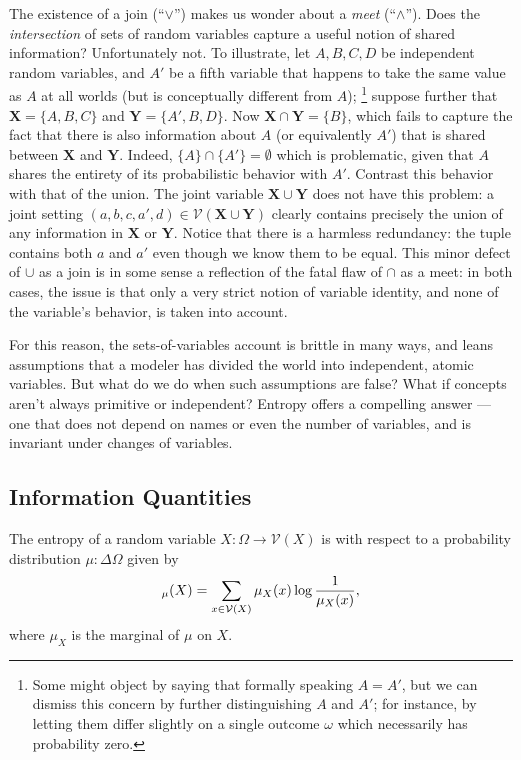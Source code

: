 \documentclass{article}
\theoremstyle{plain}
\theoremstyle{definition}
\theoremstyle{remark}
\let\H\relax
\DeclareMathOperator{\H}{\mathrm{H}} %
\newcommand{\mat}[1]{\mathbf{#1}}
\newcommand{\V}{\mathcal V}
\begin{document}
	
	The existence of a join (``$\lor$'') makes us wonder about a \emph{meet} (``$\land$''). Does the \emph{intersection} of sets of random variables capture a useful notion of shared information? Unfortunately not.
	To illustrate, let $A, B, C, D$ be independent random variables, and $A'$ be a fifth variable that happens to take the same value as $A$ at all worlds (but is conceptually different from $A$);%
		\footnote{Some might object by saying that formally speaking $A = A'$, but we can dismiss this concern by further distinguishing $A$ and $A'$; for instance, by letting them differ slightly on a single outcome $\omega$ which necessarily has probability zero.}
	suppose further that $\mat X = \{A,B,C\}$ and $\mat Y = \{A', B, D\}$. Now $\mat X \cap \mat Y = \{B\}$, which fails to capture the fact that there is also information about $A$ (or equivalently $A'$) that is shared between $\mat X$ and $\mat Y$. Indeed, $\{A\} \cap \{A'\} = \emptyset$ which is problematic, given that $A$ shares the entirety of its probabilistic behavior with $A'$.
	Contrast this behavior with that of the union.  The joint variable $\mat X \cup \mat Y$ does not have this problem: a joint setting $(a,b,c,a',d) \in \V(\mat X \cup \mat Y)$ clearly contains precisely the union of any information in $\mat X$ or $\mat Y$. Notice that there is a harmless redundancy: the tuple contains both $a$ and $a'$ even though we know them to be equal. This minor defect of $\cup$ as a join is in some sense a reflection of the fatal flaw of $\cap$ as a meet: in both cases, the issue is that only a very strict notion of variable identity, and none of the variable's behavior, is taken into account.
	
	For this reason, the sets-of-variables account is brittle in many ways, and leans assumptions that a modeler has divided the world into independent, atomic variables. But what do we do when such assumptions are false? What if concepts aren't always primitive or independent? Entropy offers a compelling answer --- one that does not depend on names or even the number of variables, and is invariant under changes of variables.
	
	\subsection{Information Quantities}
	
	\begin{defn}\label{def:entropy}
		The entropy of a random variable $X : \Omega \to \V(X)$ is with respect to a probability distribution $\mu : \Delta \Omega$ given by
		\[ \H_\mu(X) = \sum_{x \in \V(X)} \mu_X(x) \log \frac{1}{\mu_X(x)} ,\]
		where $\mu_X$ is the marginal of $\mu$ on $X$. 
	\end{defn}
\end{document}
